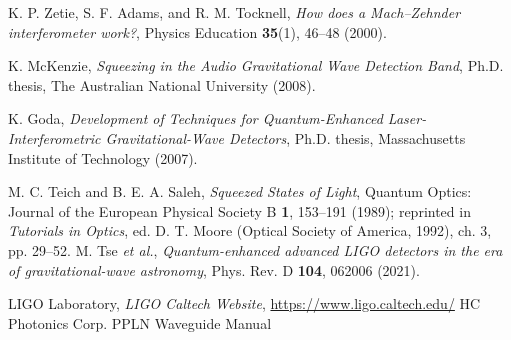 \documentclass[colorlinks=true,pdfstartview=FitV,linkcolor=blue,
citecolor=red,urlcolor=magenta]{ligodoc}
\begin{document}
\begin{thebibliography}{9}

\label{1}
K. P. Zetie, S. F. Adams, and R. M. Tocknell, 
\emph{How does a Mach–Zehnder interferometer work?}, 
Physics Education \textbf{35}(1), 46–48 (2000).

K. McKenzie, 
\emph{Squeezing in the Audio Gravitational Wave Detection Band}, 
Ph.D. thesis, The Australian National University (2008).

K. Goda, 
\emph{Development of Techniques for Quantum-Enhanced Laser-Interferometric Gravitational-Wave Detectors}, 
Ph.D. thesis, Massachusetts Institute of Technology (2007).

M. C. Teich and B. E. A. Saleh, 
\emph{Squeezed States of Light}, 
Quantum Optics: Journal of the European Physical Society B \textbf{1}, 153–191 (1989); reprinted in \emph{Tutorials in Optics}, ed. D. T. Moore (Optical Society of America, 1992), ch. 3, pp. 29–52.
M. Tse \textit{et al.},
\emph{Quantum-enhanced advanced LIGO detectors in the era of gravitational-wave astronomy},
Phys. Rev. D \textbf{104}, 062006 (2021).

LIGO Laboratory, \emph{LIGO Caltech Website}, \url{https://www.ligo.caltech.edu/}
HC Photonics Corp.
PPLN Waveguide Manual
\end{thebibliography}
\end{document}
